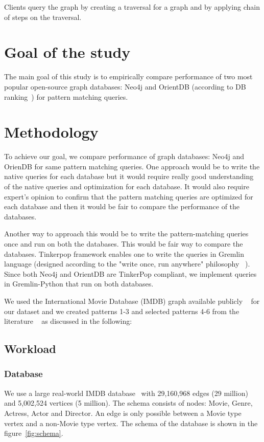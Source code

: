 Clients query the graph by creating a traversal for a graph and by applying chain of steps on the traversal.

\section{Goal of the study}

The main goal of this study is to empirically compare performance of two most popular open-source graph databases: Neo4j and OrientDB (according to DB ranking~\cite{dbranking}) for pattern matching queries.

\section{Methodology}

To achieve our goal, we compare performance of graph databases: Neo4j and OrienDB for same pattern matching queries. One approach would be to write the native queries for each database but it would require really good understanding of the native queries and optimization for each database. It would also require expert's opinion to confirm that the pattern matching queries are optimized for each database and then it would be fair to compare the performance of the databases.

Another way to approach this would be to write the pattern-matching queries once and run on both the databases. This would be fair way to compare the databases. Tinkerpop framework enables one to write the queries in Gremlin language (designed according to the "write once, run anywhere" philosophy ~\cite{gremlin}). Since both Neo4j and OrientDB are TinkerPop compliant, we implement queries in Gremlin-Python that run on both databases. 

We used the International Movie Database (IMDB) graph available publicly ~\cite{IMDb96:online} for our dataset and  we created patterns 1-3 and selected patterns 4-6 from the literature ~\cite{tripoulthere} as discussed in the following:  

\subsection{Workload}

\subsubsection{Database}

We use a large real-world IMDB database~\cite{IMDb96:online} with 29,160,968 edges (29 million) and 5,002,524 vertices (5 million). The schema consists of nodes: Movie, Genre,
Actress, Actor and Director. An edge is only possible between a Movie type vertex and a non-Movie type vertex. 
The schema of the database is shown in the figure~\ref{fig:schema}. 

